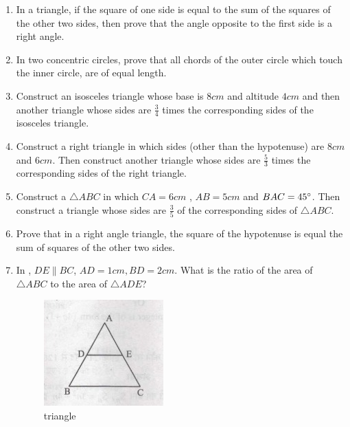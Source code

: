 \begin{enumerate}
\item In a triangle, if the square of one side is equal to the sum of the squares of the other two sides, then prove that the angle opposite to the first side is a right angle.

\item In two concentric circles, prove that all chords of the outer circle which touch the inner circle, are of equal length.

\item Construct an isosceles triangle whose base is $8 cm$ and altitude $4 cm$ and then another triangle whose sides are $\frac{3}{4}$ times the corresponding sides of the isosceles triangle.

\item Construct a right triangle in which sides (other than the hypotenuse) are $8 cm$ and $6 cm$. Then construct another triangle whose sides are $\frac{5}{3}$ times the corresponding sides of the right triangle.

\item Construct a $\triangle ABC$ in which $CA = 6cm$ , $AB = 5cm$ and $BAC= 45\degree$. Then  construct a triangle whose sides are $\frac{3}{5}$ of the corresponding sides of $\triangle ABC$.
\item Prove that in a right angle triangle, the square of the hypotenuse is equal the sum of squares of the other two sides.
\item In , $DE \parallel BC$, $ AD = 1 cm , BD = 2 cm$. What is the ratio of the area of $\triangle ABC$ to the area of $\triangle ADE$?
	\begin{figure}[H]
				\centering
				\includegraphics[width=\columnwidth]{figs/tri123.jpeg}
				\caption{triangle}
				\label{fig:tri35}
				

\end{figure}
\end{enumerate}
